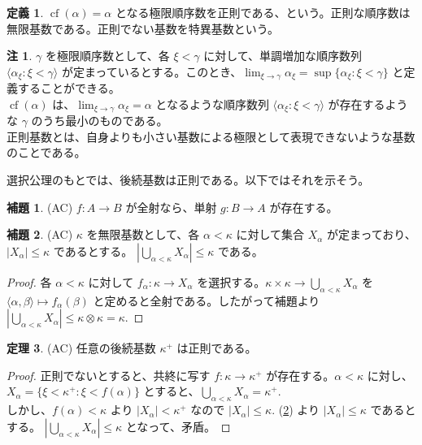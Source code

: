 \documentclass{jsarticle}
\theoremstyle{definition}
\newtheorem*{definition*}{定義}
\newtheorem{theorem}{定理}[section]
\newtheorem{lemma}[theorem]{補題}
\newtheorem{remark}{注}[section]
\begin{document}
    \begin{definition*}
        $\operatorname{cf}(\alpha) = \alpha$ となる極限順序数を正則である、という。正則な順序数は無限基数である。正則でない基数を特異基数という。
    \end{definition*}
    \begin{remark}
        $\gamma$ を極限順序数として、各 $\xi < \gamma$ に対して、単調増加な順序数列 $\langle \alpha_\xi : \xi<\gamma \rangle$ が定まっているとする。このとき、$\displaystyle \lim_{\xi \to \gamma} \alpha_\xi = \sup \{ \alpha_\xi : \xi < \gamma\}$ と定義することができる。\\
        $\operatorname{cf}(\alpha)$ は、$\displaystyle \lim_{\xi \to \gamma} \alpha_\xi = \alpha$ となるような順序数列 $\langle \alpha_\xi : \xi<\gamma \rangle$ が存在するような $\gamma$ のうち最小のものである。\\
        正則基数とは、自身よりも小さい基数による極限として表現できないような基数のことである。
    \end{remark}
    
    \vspace{0.5ex}
    
    選択公理のもとでは、後続基数は正則である。以下ではそれを示そう。
    \begin{lemma} (AC)
        $f : A \rightarrow B$ が全射なら、単射 $g : B \rightarrow A$ が存在する。
    \end{lemma}
    \begin{lemma} (AC) \label{union_kappa_kappa}
        $\kappa$ を無限基数として、各 $\alpha < \kappa$ に対して集合 $X_\alpha$ が定まっており、$|X_\alpha| \leq \kappa$ であるとする。 $\displaystyle \left| \bigcup_{\alpha < \kappa} X_\alpha \right| \leq \kappa$ である。
    \end{lemma}
    \begin{proof}
        各 $\alpha < \kappa$ に対して $f_\alpha : \kappa \rightarrow X_\alpha$ を選択する。$\displaystyle \kappa \times \kappa \rightarrow \bigcup_{\alpha < \kappa} X_\alpha$ を $\langle \alpha, \beta \rangle \mapsto f_\alpha(\beta)$ と定めると全射である。したがって補題より $\displaystyle \left| \bigcup_{\alpha < \kappa} X_\alpha \right| \leq \kappa \otimes \kappa = \kappa.$
    \end{proof}
    
    \begin{theorem} (AC)
        任意の後続基数 $\kappa^+$ は正則である。
    \end{theorem}
    \begin{proof}
        正則でないとすると、共終に写す $f : \kappa \rightarrow \kappa^+$ が存在する。$\alpha < \kappa$ に対し、$X_\alpha = \{\xi < \kappa^+ : \xi < f(\alpha)\}$ とすると、$\displaystyle \bigcup_{\alpha < \kappa} X_\alpha = \kappa^+.$\\
        しかし、$f(\alpha) < \kappa$ より $|X_\alpha| < \kappa^+$ なので $|X_\alpha| \leq \kappa.$ (\ref{union_kappa_kappa}) より $|X_\alpha| \leq \kappa$ であるとする。 $\displaystyle \left| \bigcup_{\alpha < \kappa} X_\alpha \right| \leq \kappa$ となって、矛盾。
    \end{proof}
    
\end{document}
